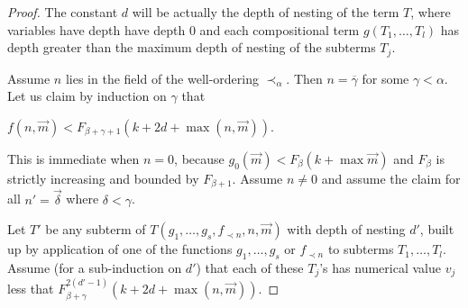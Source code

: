\documentclass[8pt]{article}
\theoremstyle{definition}
\theoremstyle{definition}
\theoremstyle{definition}
\theoremstyle{definition}
\theoremstyle{definition}
\theoremstyle{definition}
\theoremstyle{definition}
\theoremstyle{definition}
\theoremstyle{definition}
\theoremstyle{definition}
\theoremstyle{definition}
\theoremstyle{definition}
\theoremstyle{definition}
\theoremstyle{question}
\begin{document}
\begin{proof}
  The constant $d$ will be actually the depth of nesting of the term $T$, where variables
  have depth have depth $0$ and each compositional term $g(T_1, \dots, T_l)$ has depth greater than the
  maximum depth of nesting of the subterms $T_j$.

  Assume $n$ lies in the field of the well-ordering $\prec_{\alpha}$. 
  Then $n = \overline{\gamma}$ for some $\gamma < \alpha$. Let us claim by induction on $\gamma$ that
  \begin{center}
    $f(n, \vec{m}) < F_{\beta + \gamma + 1}(k + 2 d+ \max(n, \vec{m}))$.
  \end{center}
  This is immediate when $n = 0$, because $g_0(\vec{m}) < F_{\beta}(k + \max \vec{m})$
  and $F_{\beta}$ is strictly increasing and bounded by $F_{\beta + 1}$.
  Assume $n \neq 0$ and assume the claim for all $n' = \vec{\delta}$ where $\delta < \gamma$.

  Let $T'$ be any subterm of $T(g_1, \dots, g_s, f_{\prec n},n, \vec{m})$ with depth of nesting $d'$,
  built up by application of one of the functions $g_1, \dots, g_s$ or $f_{\prec n}$ to subterms $T_1, \dots, T_l$.
  Assume (for a sub-induction on $d'$) that each of these $T_j$'s has numerical value $v_j$ less that 
  $F^{2 (d' - 1)}_{\beta + \gamma}(k + 2 d + \max(n, \vec{m}))$.


\end{proof}
\end{document}

